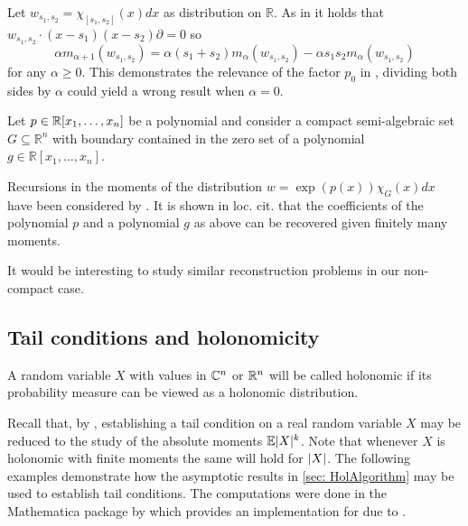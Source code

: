 \begin{example}
  Let $w_{s_1,s_2} = \chi_{[s_1,s_2]}(x)dx$ as distribution on $\mathbb{R}$.
  As in  it holds that $w_{s_1,s_2}\cdot (x-s_1)(x-s_2) \partial =0$ so
  $$\alpha m_{\alpha +1}(w_{s_1,s_2}) = \alpha (s_1 + s_2)m_{\alpha}(w_{s_1,s_2}) - \alpha s_1 s_2 m_{\alpha}(w_{s_1,s_2})$$
  for any $\alpha \geq 0$.
  This demonstrates the relevance of the factor $p_0$ in , dividing both sides by $\alpha$ could yield a wrong result when $\alpha = 0$.
\end{example}
\begin{remark}
  Let $p\in \mathbb{R}[x_1,\ldots,x_n]$ be a polynomial and consider a compact semi-algebraic set $G\subseteq \mathbb{R}^n$ with boundary contained in the zero set of a polynomial $g\in \mathbb{R}[x_1,\ldots,x_n]$.

  Recursions in the moments of the distribution $w = \exp(p(x)) \chi_G(x) dx$ have been considered by \cite{brehard2019moment}.
  It is shown in loc. cit. that the coefficients of the polynomial $p$ and a polynomial $g$ as above can be recovered given finitely many moments.

  It would be interesting to study similar reconstruction problems in our non-compact case.
\end{remark}
\subsection{Tail conditions and holonomicity}
A random variable $X$ with values in $\mathbb{C}^n$ or $\mathbb{R}^n$ will be called holonomic if its probability measure can be viewed as a holonomic distribution.

Recall that, by , establishing a tail condition on a real random variable $X$ may be reduced to the study of the absolute moments $\mathbb{E}\vert X \vert^k$.
Note that whenever $X$ is holonomic with finite moments the same will hold for $\vert X \vert$.
The following examples demonstrate how the asymptotic results in \cref{sec: HolAlgorithm} may be used to establish tail conditions.
The computations were done in the Mathematica package by \cite{kauers2011mathematica} which provides an implementation for  due to \cite{birkhoff1933analytic}.

